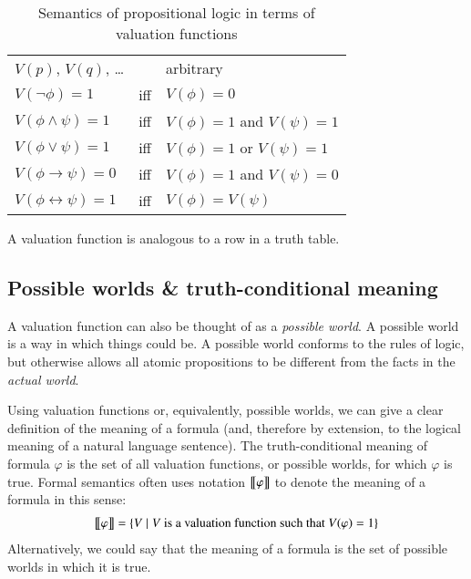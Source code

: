 \documentclass[nobib,nofonts]{tufte-handout}
\begin{document}
\begin{table}
  \centering
  \begin{tabular}{lcl}
    $V(p)$, $V(q)$, \dots && arbitrary\\
    $V(\neg \phi) = 1$ & iff & $V(\phi) =0$\\
    $V(\phi \wedge \psi) = 1$ & iff & $V(\phi) =1$ and $V(\psi) = 1$\\
    $V(\phi \vee \psi) = 1$ & iff & $V(\phi) =1$ or $V(\psi) = 1$\\
    $V(\phi \rightarrow \psi) = 0$ & iff & $V(\phi) =1$ and $V(\psi) = 0$\\
    $V(\phi \leftrightarrow \psi) = 1$ & iff & $V(\phi) = V(\psi)$
  \end{tabular}
  \caption{Semantics of propositional logic in terms of valuation functions}
  \label{tab:proplog-semantics-valuation-functions}
\end{table}

A valuation function is analogous to a row in a truth table.

\subsection{Possible worlds \& truth-conditional meaning}

A valuation function can also be thought of as a \emph{possible world}.
A possible world is a way in which things could be.
A possible world conforms to the rules of logic, but otherwise allows all atomic propositions to be different from the facts in the \emph{actual world}.

Using valuation functions or, equivalently, possible worlds, we can give a clear definition of the meaning of a formula (and, therefore by extension, to the logical meaning of a natural language sentence).
The truth-conditional meaning of formula $\varphi$ is the set of all valuation functions, or possible worlds, for which $\varphi$ is true.
Formal semantics often uses notation $\left [\! \left [ \varphi \right ]\! \right]$ to denote the meaning of a formula in this sense:
\begin{align*}
  \left [\! \left [ \varphi \right ]\! \right] = \left\{V \mid V \text{ is a valuation function such that } V(\varphi)=1 \right\}
\end{align*}
Alternatively, we could say that the meaning of a formula is the set of possible worlds in which it is true.
\end{document}
